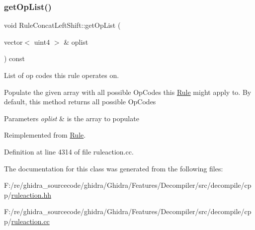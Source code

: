 \subsubsection{\texorpdfstring{getOpList()}{getOpList()}}
{\footnotesize\ttfamily void Rule\+Concat\+Left\+Shift\+::get\+Op\+List (\begin{DoxyParamCaption}\item[{vector$<$ uint4 $>$ \&}]{oplist }\end{DoxyParamCaption}) const\hspace{0.3cm}{\ttfamily [virtual]}}



List of op codes this rule operates on. 

Populate the given array with all possible Op\+Codes this \mbox{\hyperlink{class_rule}{Rule}} might apply to. By default, this method returns all possible Op\+Codes 
\begin{DoxyParams}{Parameters}
{\em oplist} & is the array to populate \\
\hline
\end{DoxyParams}


Reimplemented from \mbox{\hyperlink{class_rule_a4023bfc7825de0ab866790551856d10e}{Rule}}.



Definition at line 4314 of file ruleaction.\+cc.



The documentation for this class was generated from the following files\+:\begin{DoxyCompactItemize}
\item 
F\+:/re/ghidra\+\_\+sourcecode/ghidra/\+Ghidra/\+Features/\+Decompiler/src/decompile/cpp/\mbox{\hyperlink{ruleaction_8hh}{ruleaction.\+hh}}\item 
F\+:/re/ghidra\+\_\+sourcecode/ghidra/\+Ghidra/\+Features/\+Decompiler/src/decompile/cpp/\mbox{\hyperlink{ruleaction_8cc}{ruleaction.\+cc}}\end{DoxyCompactItemize}

